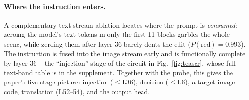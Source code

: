 \paragraph{Where the instruction enters.} A complementary text-stream
ablation locates where the prompt is \emph{consumed}: zeroing the model's
text tokens in only the first 11 blocks garbles the whole scene, while
zeroing them after layer 36 barely dents the edit ($P(\text{red}){=}0.993$).
The instruction is fused into the image stream early and is functionally
complete by layer 36 -- the ``injection'' stage of the circuit in
Fig.~\ref{fig:teaser}, whose full text-band table is in the supplement.
Together with the probe, this gives the paper's five-stage picture:
injection ($\le$L36), decision ($\le$L6), a target-image code, translation
(L52--54), and the output head.
